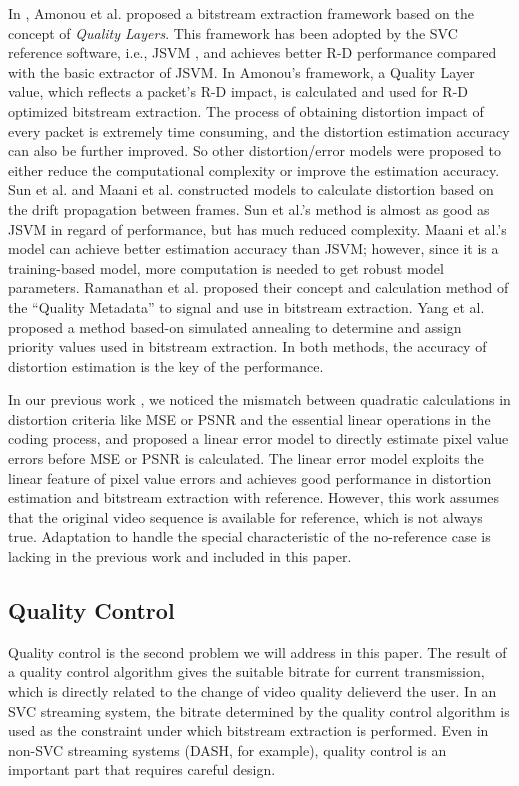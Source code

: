 \documentclass[journal]{IEEEtran}
\begin{document}
In \cite{Amonou07}, Amonou et al. proposed a bitstream extraction framework based on the concept of \textit{Quality Layers}. This framework has been adopted by the SVC reference software, i.e., JSVM  \cite{JSVM}, and achieves better R-D performance compared with the basic extractor of JSVM. In Amonou's framework, a Quality Layer value, which reflects a packet's R-D impact, is calculated and used for R-D optimized bitstream extraction. The process of obtaining distortion impact of every packet is extremely time consuming, and the distortion estimation accuracy can also be further improved. So other distortion/error models were proposed to either reduce the computational complexity or improve the estimation accuracy. Sun et al. \cite{Sun09} and Maani et al. \cite{Maani09} constructed models to calculate distortion based on the drift propagation between frames. Sun et al.'s method is almost as good as JSVM in regard of performance, but has much reduced complexity. Maani et al.'s model can achieve better estimation accuracy than JSVM; however, since it is a training-based model, more computation is needed to get robust model parameters. Ramanathan et al. \cite{Ramanathan12} proposed their concept and calculation method of the ``Quality Metadata'' to signal and use in bitstream extraction. Yang et al. \cite{Yang13} proposed a method based-on simulated annealing to determine and assign priority values used in bitstream extraction. In both methods, the accuracy of distortion estimation is the key of the performance.

In our previous work \cite{Zhang12}, we noticed the mismatch between quadratic calculations in distortion criteria like MSE or PSNR and the essential linear operations in the coding process, and proposed a linear error model to directly estimate pixel value errors before MSE or PSNR is calculated. The linear error model exploits the linear feature of pixel value errors and achieves good performance in distortion estimation and bitstream extraction with reference. However, this work assumes that the original video sequence is available for reference, which is not always true. Adaptation to handle the special characteristic of the no-reference case is lacking in the previous work and included in this paper.

\subsection{Quality Control}
\label{subsec:analysis-control}

Quality control is the second problem we will address in this paper. The result of a quality control algorithm gives the suitable bitrate for current transmission, which is directly related to the change of video quality delieverd the user. In an SVC streaming system, the bitrate determined by the quality control algorithm is used as the constraint under which bitstream extraction is performed. Even in non-SVC streaming systems (DASH, for example), quality control is an important part that requires careful design.
\end{document}
